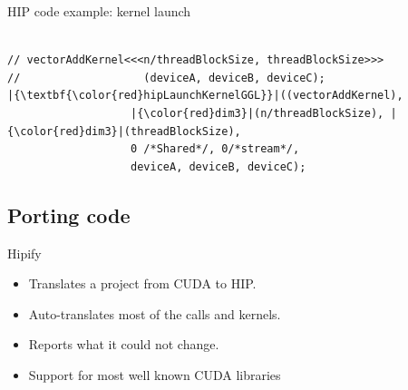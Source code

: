 \documentclass[aspectratio=169]{beamer}
\begin{document}
\begin{frame}[fragile]{HIP code example: kernel launch}

\begin{verbatim}

// vectorAddKernel<<<n/threadBlockSize, threadBlockSize>>>
//                   (deviceA, deviceB, deviceC);
|{\textbf{\color{red}hipLaunchKernelGGL}}|((vectorAddKernel), 
                   |{\color{red}dim3}|(n/threadBlockSize), |{\color{red}dim3}|(threadBlockSize),
                   0 /*Shared*/, 0/*stream*/,
                   deviceA, deviceB, deviceC);
\end{verbatim}
\end{frame}

\subsection{Porting code}
\begin{frame}{Hipify}

\begin{itemize}
    \item Translates a project from CUDA to HIP.
    \item Auto-translates most of the calls and kernels.
    \item Reports what it could not change.
    \item Support for most well known CUDA libraries
\end{itemize}
\end{frame}
\end{document}
